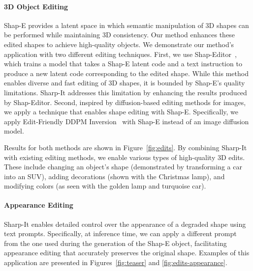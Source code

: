 \vspace{-12pt}
\paragraph{3D Object Editing}


Shap-E provides a latent space in which semantic manipulation of 3D shapes can be performed while maintaining 3D consistency. Our method enhances these edited shapes to achieve high-quality objects. We demonstrate our method's application with two different editing techniques.
First, we use Shap-Editor~\cite{chen2023shapeditor}, which trains a model that takes a Shap-E latent code and a text instruction to produce a new latent code corresponding to the edited shape. While this method enables diverse and fast editing of 3D shapes, it is bounded by Shap-E's quality limitations. Sharp-It addresses this limitation by enhancing the results produced by Shap-Editor.
Second, inspired by diffusion-based editing methods for images, we apply a technique that enables shape editing with Shap-E. Specifically, we apply Edit-Friendly DDPM Inversion~\cite{huberman2024edit} with Shap-E instead of an image diffusion model.

Results for both methods are shown in Figure~\ref{fig:edits}. By combining Sharp-It with existing editing methods, we enable various types of high-quality 3D edits. These include changing an object's shape (demonstrated by transforming a car into an SUV), adding decorations (shown with the Christmas lamp), and modifying colors (as seen with the golden lamp and turquoise car).


\vspace{-16pt}
\paragraph{Appearance Editing} \label{sec:app-edit}
Sharp-It enables detailed control over the appearance of a degraded shape using text prompts. Specifically, at inference time, we can apply a different prompt from the one used during the generation of the Shap-E object, facilitating appearance editing that accurately preserves the original shape. Examples of this application are presented in Figures~\ref{fig:teaser} and \ref{fig:edits-appearance}.

% 


\vspace{-14pt}
